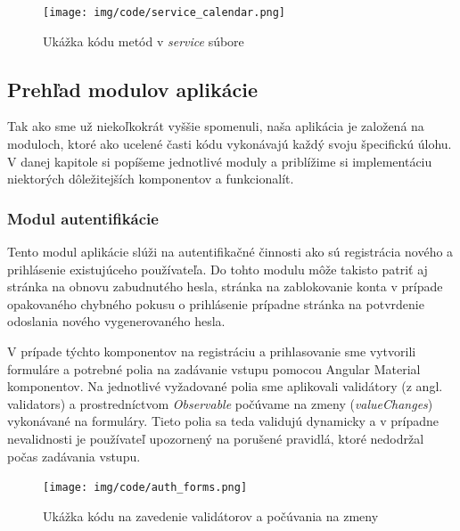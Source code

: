 \newpage
\begin{figure}[ht]
  \centering
  \texttt{[image: img/code/service\_calendar.png]}
  \caption{\label{fig:service_calendar} Ukážka kódu metód v \textit{service} súbore}
\end{figure}

\subsection{Prehľad modulov aplikácie}
\label{subsec:modules_structure}

Tak ako sme už niekoľkokrát vyššie spomenuli, naša aplikácia je založená na moduloch, ktoré ako ucelené
časti kódu vykonávajú každý svoju špecifickú úlohu. V danej kapitole si popíšeme jednotlivé moduly
a priblížime si implementáciu niektorých dôležitejších komponentov a funkcionalít.

\subsubsection{Modul autentifikácie}
\label{subsubsec: authentication_module}

Tento modul aplikácie slúži na autentifikačné činnosti ako sú registrácia nového
a prihlásenie existujúceho používateľa. Do tohto modulu môže takisto patriť aj
stránka na obnovu zabudnutého hesla, stránka na zablokovanie konta v prípade
opakovaného chybného pokusu o prihlásenie prípadne stránka na potvrdenie
odoslania nového vygenerovaného hesla.

V prípade týchto komponentov na registráciu a prihlasovanie sme vytvorili formuláre
a potrebné polia na zadávanie vstupu pomocou Angular Material komponentov.
Na jednotlivé vyžadované polia sme aplikovali validátory (z angl. validators) 
a prostredníctvom \textit{Observable} počúvame na zmeny (\textit{valueChanges})
vykonávané na formuláry. Tieto polia sa teda validujú dynamicky a v prípadne nevalidnosti
je používateľ upozornený na porušené pravidlá, ktoré nedodržal počas zadávania vstupu.

\newpage
\begin{figure}[ht]
  \centering
  \texttt{[image: img/code/auth\_forms.png]}
  \caption{\label{fig:/auth_forms} Ukážka kódu na zavedenie validátorov a počúvania na zmeny}
\end{figure}

